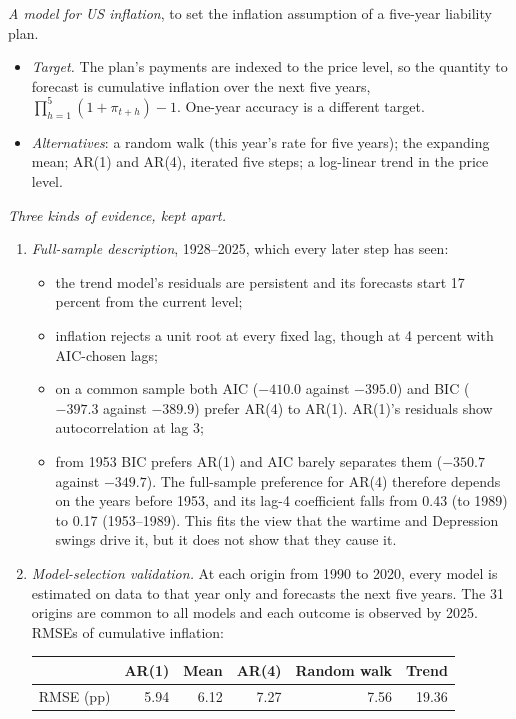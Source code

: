 \begin{qfmethod}
 \emph{A model for US inflation}, to set the inflation assumption of a five-year liability plan.
\begin{itemize}
\item \emph{Target.} The plan's payments are indexed to the price level, so the quantity to forecast is cumulative inflation over the next five years, $\prod_{h=1}^{5}(1+\pi_{t+h})-1$. One-year accuracy is a different target.
\item \emph{Alternatives}: a random walk (this year's rate for five years); the expanding mean; AR(1) and AR(4), iterated five steps; a log-linear trend in the price level.
\end{itemize}

\emph{Three kinds of evidence, kept apart.}
\begin{enumerate}
\item \emph{Full-sample description}, 1928--2025, which every later step has seen:
\begin{itemize}
\item the trend model's residuals are persistent and its forecasts start 17 percent from the current level;
\item inflation rejects a unit root at every fixed lag, though at 4 percent with AIC-chosen lags;
\item on a common sample both AIC ($-410.0$ against $-395.0$) and BIC ($-397.3$ against $-389.9$) prefer AR(4) to AR(1). AR(1)'s residuals show autocorrelation at lag 3;
\item from 1953 BIC prefers AR(1) and AIC barely separates them ($-350.7$ against $-349.7$). The full-sample preference for AR(4) therefore depends on the years before 1953, and its lag-4 coefficient falls from 0.43 (to 1989) to 0.17 (1953--1989). This fits the view that the wartime and Depression swings drive it, but it does not show that they cause it.
\end{itemize}
\item \emph{Model-selection validation.} At each origin from 1990 to 2020, every model is estimated on data to that year only and forecasts the next five years. The 31 origins are common to all models and each outcome is observed by 2025. RMSEs of cumulative inflation:
\begin{center}\small
\begin{tabular}{@{}lrrrrr@{}}
\toprule
 & AR(1) & Mean & AR(4) & Random walk & Trend \\
\midrule
RMSE (pp) & 5.94 & 6.12 & 7.27 & 7.56 & 19.36 \\

\end{tabular}
\end{center}
\end{enumerate}
\end{qfmethod}
